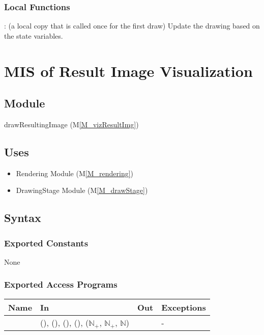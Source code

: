 \documentclass[12pt, titlepage]{article}
\newcommand{\mref}[1]{M\ref{#1}}
\newcommand{\mrefp}[1]{(\mref{#1})}
\newcommand{\mreff}[1]{Module \mrefp{#1}}
\begin{document}
\subsubsection{Local Functions}
: (a local copy that is called once for the first draw)
  Update the drawing based on the state variables.

\newpage



\section{MIS of Result Image Visualization} \label{MS_vizResultImg}

\subsection{Module}
drawResultingImage \mrefp{M_vizResultImg}

\subsection{Uses}
\begin{itemize}
  \item Rendering \mreff{M_rendering}
  \item DrawingStage \mreff{M_drawStage}
\end{itemize}

\subsection{Syntax}

\subsubsection{Exported Constants}
None
\subsubsection{Exported Access Programs}

\begin{center}
\begin{tabular}{L{5cm} L{4cm} L{4cm} L{2cm}}
\hline
\textbf{Name} & \textbf{In} & \textbf{Out} & \textbf{Exceptions} \\
\hline
{} &  (),
   (),  (),
   (),
   ($\mathbb{N}_+$, $\mathbb{N}_+$, $\mathbb{N}$)
  &  & - \\
\hline
\end{tabular}
\end{center}
\end{document}
